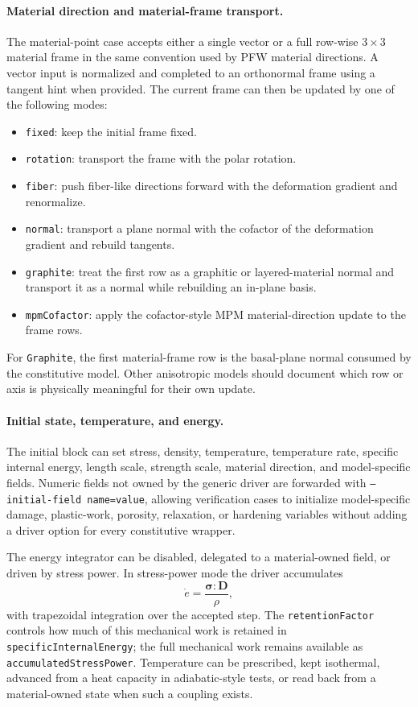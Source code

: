 \paragraph{Material direction and material-frame transport.}
The material-point case accepts either a single vector or a full row-wise \(3\times 3\) material frame in the same convention used by PFW material directions.  A vector input is normalized and completed to an orthonormal frame using a tangent hint when provided.  The current frame can then be updated by one of the following modes:
\begin{itemize}[leftmargin=*]
  \item \texttt{fixed}: keep the initial frame fixed.
  \item \texttt{rotation}: transport the frame with the polar rotation.
  \item \texttt{fiber}: push fiber-like directions forward with the deformation gradient and renormalize.
  \item \texttt{normal}: transport a plane normal with the cofactor of the deformation gradient and rebuild tangents.
  \item \texttt{graphite}: treat the first row as a graphitic or layered-material normal and transport it as a normal while rebuilding an in-plane basis.
  \item \texttt{mpmCofactor}: apply the cofactor-style MPM material-direction update to the frame rows.
\end{itemize}
For \texttt{Graphite}, the first material-frame row is the basal-plane normal consumed by the constitutive model.  Other anisotropic models should document which row or axis is physically meaningful for their own update.

\paragraph{Initial state, temperature, and energy.}
The initial block can set stress, density, temperature, temperature rate, specific internal energy, length scale, strength scale, material direction, and model-specific fields.  Numeric fields not owned by the generic driver are forwarded with \texttt{--initial-field name=value}, allowing verification cases to initialize model-specific damage, plastic-work, porosity, relaxation, or hardening variables without adding a driver option for every constitutive wrapper.

The energy integrator can be disabled, delegated to a material-owned field, or driven by stress power.  In stress-power mode the driver accumulates
\begin{equation}
  \dot e = \frac{\boldsymbol{\sigma}:\mathbf{D}}{\rho},
\end{equation}
with trapezoidal integration over the accepted step.  The \texttt{retentionFactor} controls how much of this mechanical work is retained in \texttt{specificInternalEnergy}; the full mechanical work remains available as \texttt{accumulatedStressPower}.  Temperature can be prescribed, kept isothermal, advanced from a heat capacity in adiabatic-style tests, or read back from a material-owned state when such a coupling exists.

